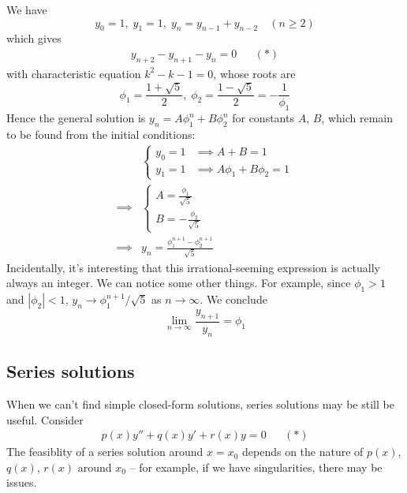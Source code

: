 \documentclass{../template/note}
\begin{document}
    \begin{example}
        We have
        \[  
            y_0 = 1, \; y_1 = 1, \; y_n = y_{n-1} + y_{n-2} \quad (n \geq 2)
        \]
        which gives
        \begin{align*}
            y_{n+2}-y_{n+1}-y_n = 0 && (*)
        \end{align*}
        with characteristic equation \(k^2 - k - 1 = 0\), whose roots are
        \[
            \phi_1 = \frac{1+\sqrt 5}{2}, \; \phi_2 = \frac{1 - \sqrt 5}{2} = -\frac{1}{\phi_1}
        \]
        Hence the general solution is \(y_n = A\phi_1^n + B\phi_2^n\) for constants \(A\), \(B\), which remain to be found from the initial conditions:
        \begin{align*}
            &\begin{cases}
                y_0 = 1 &\implies A + B = 1 \\
                y_1 = 1 &\implies A\phi_1 + B\phi_2 = 1
            \end{cases} \\
            \implies& \begin{cases}
                A = \frac{\phi_1}{\sqrt 5} \\
                B = -\frac{\phi_2}{\sqrt 5}
            \end{cases} \\
            \implies& y_n = \frac{\phi_1^{n+1} - \phi_2^{n+1}}{\sqrt 5}
        \end{align*}
        Incidentally, it's interesting that this irrational-seeming expression is actually always an integer. We can notice some other things. For example, since \(\phi_1 > 1\) and \(|\phi_2| < 1\), \(y_n \to \phi_1^{n+1}/\sqrt 5\) as \(n \to \infty\). We conclude
        \[
            \lim_{n \to \infty} \frac{y_{n+1}}{y_n} = \phi_1
        \]        
    \end{example}

    \subsection{Series solutions}

    When we can't find simple closed-form solutions, series solutions may be still be useful. Consider
    \begin{align*}
        p(x)y'' + q(x)y' + r(x)y = 0 && (*)
    \end{align*}
    The feasiblity of a series solution around \(x=x_0\) depends on the nature of \(p(x)\), \(q(x)\), \(r(x)\) around \(x_0\) -- for example, if we have singularities, there may be issues.
\end{document}
